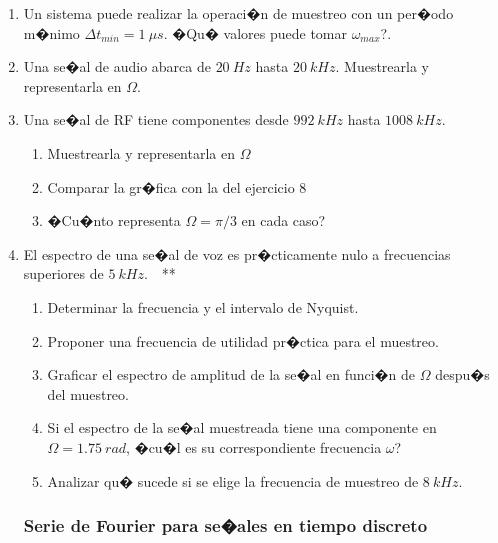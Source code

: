 \documentclass[10pt,a4paper]{article}
\begin{document}
\begin{enumerate}
\item {Un sistema puede realizar la operaci�n de muestreo con un per�odo m�nimo $\Delta t_{min}=1~\mu s$. �Qu� valores 
puede tomar $\omega_{max}$?}.

\item {Una se�al de audio abarca de $20~Hz$ hasta $20~kHz$. Muestrearla y representarla en $\Omega$.}

\item {Una se�al de RF tiene componentes desde $992~kHz$ hasta $1008~kHz$}.
\begin{enumerate}
	\item Muestrearla y representarla en $\Omega$			
	\item Comparar la gr�fica con la del ejercicio 8
	\item �Cu�nto representa $\Omega=\pi/3$ en cada caso?			
\end{enumerate}	

\item {El espectro de una se�al de voz es pr�cticamente nulo a frecuencias superiores de $5~kHz$.}~~**
\begin{enumerate}
	\item Determinar la frecuencia y el intervalo de Nyquist.		
	\item Proponer una frecuencia de utilidad pr�ctica para el muestreo.
	\item Graficar el espectro de amplitud de la se�al en funci�n de $\Omega$ despu�s del muestreo.
	\item Si el espectro de la se�al muestreada tiene una componente en $\Omega=1.75~rad$, �cu�l es su correspondiente 
	frecuencia $\omega$?
	\item Analizar qu� sucede si se elige la frecuencia de muestreo de $8~kHz$.
\end{enumerate}	
	
\subsubsection*{Serie de Fourier para se�ales en tiempo discreto}


\end{enumerate}
\end{document}
